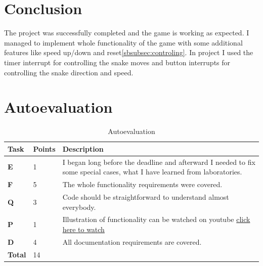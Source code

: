 \documentclass[a4paper, 11pt]{article}
\begin{document}


    \section{Conclusion}\label{sec:conclusion}
    The project was successfully completed and the game is working as expected.
    I managed to implement whole functionality of the game with some additional
    features like speed up/down and reset\ref{sbsubsec:controling}.
    In project I used the timer interrupt for controlling the snake moves
    and button interrupts for controlling the snake direction and speed.




    \section{Autoevaluation}\label{sec:autoevaluation}
    \begin{table}[H]
        \centering
        \caption{Autoevaluation}\label{tab:table1}
        \label{tab:my_label}
        \begin{tabularx}{\textwidth}{XXX}
            \toprule
            \textbf{Task}  & \textbf{Points} & \textbf{Description}                                                                                                      \\
            \midrule
            \textbf{E}     & 1               & I began long before the deadline and afterward I needed to fix some special cases, what I have learned from laboratories. \\
            \hline
            \textbf{F}     & 5               & The whole functionality requirements were covered.                                                                        \\
            \hline
            \textbf{Q}     & 3               & Code should be straightforward to understand almost everybody.                                                            \\
            \hline
            \textbf{P}     & 1               & Illustration of functionality can be watched on youtube \href{https://youtu.be/V0ONHRM66mM}{click here to watch}          \\
            \hline
            \textbf{D}     & 4               & All documentation requirements are covered.                                                                               \\
            \hline
            \textbf{Total} & 14              &                                                                                                                           \\
            \bottomrule
        \end{tabularx}

    \end{table}


    \clearpage
    
    \renewcommand{\refname}{Literature}\label{sec:literatura}
    
\end{document}
